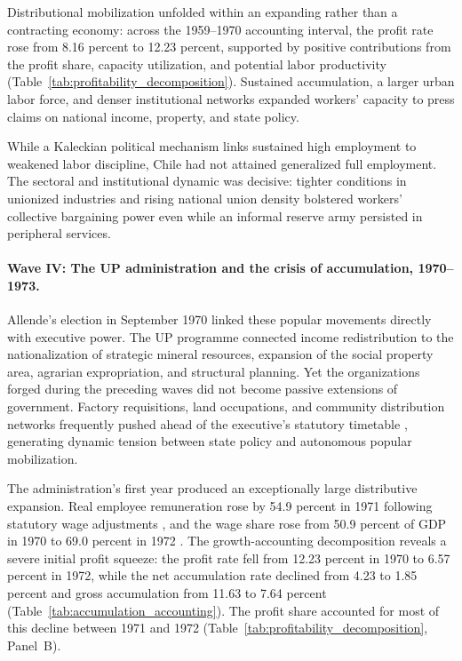 Distributional mobilization unfolded within an expanding rather than a contracting economy: across the 1959--1970 accounting interval, the profit rate rose from 8.16 percent to 12.23 percent, supported by positive contributions from the profit share, capacity utilization, and potential labor productivity (Table~\ref{tab:profitability_decomposition}). Sustained accumulation, a larger urban labor force, and denser institutional networks expanded workers' capacity to press claims on national income, property, and state policy.

While a Kaleckian political mechanism links sustained high employment to weakened labor discipline, Chile had not attained generalized full employment. The sectoral and institutional dynamic was decisive: tighter conditions in unionized industries and rising national union density bolstered workers' collective bargaining power even while an informal reserve army persisted in peripheral services.

\paragraph{Wave IV: The UP administration and the crisis of accumulation, 1970--1973.}
Allende's election in September 1970 linked these popular movements directly with executive power. The UP programme connected income redistribution to the nationalization of strategic mineral resources, expansion of the social property area, agrarian expropriation, and structural planning. Yet the organizations forged during the preceding waves did not become passive extensions of government. Factory requisitions, land occupations, and community distribution networks frequently pushed ahead of the executive's statutory timetable \citep{Winn1986,Winn2016,Schlotterbeck2018}, generating dynamic tension between state policy and autonomous popular mobilization.

The administration's first year produced an exceptionally large distributive expansion. Real employee remuneration rose by 54.9 percent in 1971 following statutory wage adjustments \citep{DeVylder1976}, and the wage share rose from 50.9 percent of GDP in 1970 to 69.0 percent in 1972 \citep{Astorga2023}. The growth-accounting decomposition reveals a severe initial profit squeeze: the profit rate fell from 12.23 percent in 1970 to 6.57 percent in 1972, while the net accumulation rate declined from 4.23 to 1.85 percent and gross accumulation from 11.63 to 7.64 percent (Table~\ref{tab:accumulation_accounting}). The profit share accounted for most of this decline between 1971 and 1972 (Table~\ref{tab:profitability_decomposition}, Panel~B).

